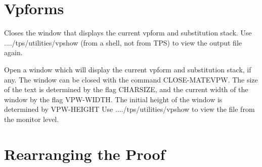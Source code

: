 \section{Vpforms}

\begin{description} 
\item[\parbox{\textwidth}{CLOSE-MATEVPW}]  
Closes the window that displays the current vpform and
substitution stack. Use ..../tps/utilities/vpshow (from a shell, 
not from TPS) to view the output file again.

\item[\parbox{\textwidth}{OPEN-MATEVPW \textit{filename}}]  
Open a window which will display the current vpform and substitution stack,
if any. The window can be closed with the command CLOSE-MATEVPW. The size 
of the text is determined by the flag CHARSIZE, and the current width of the window 
by the flag VPW-WIDTH. The initial height of the window is determined by VPW-HEIGHT
Use ..../tps/utilities/vpshow to view the file from the monitor level.
\item
\end{description}

\section{Rearranging the Proof}

